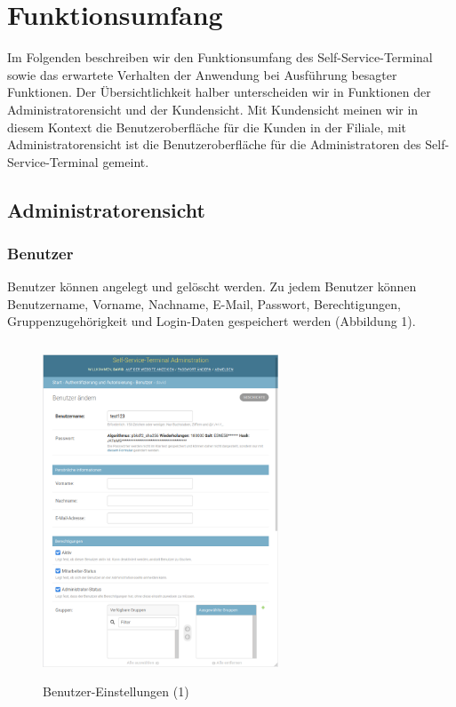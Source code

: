 \section{Funktionsumfang}
Im Folgenden beschreiben wir den Funktionsumfang des Self-Service-Terminal sowie das erwartete Verhalten der Anwendung bei Ausführung besagter Funktionen. Der Übersichtlichkeit halber unterscheiden wir in Funktionen der Administratorensicht und der Kundensicht. Mit Kundensicht meinen wir in diesem Kontext die Benutzeroberfläche für die Kunden in der Filiale, mit Administratorensicht ist die Benutzeroberfläche für die Administratoren des Self-Service-Terminal gemeint.\\

\subsection{Administratorensicht}


\subsubsection{Benutzer} Benutzer können angelegt und gelöscht werden. Zu jedem Benutzer können Benutzername, Vorname, Nachname, E-Mail, Passwort, Berechtigungen, Gruppenzugehörigkeit und Login-Daten gespeichert werden (Abbildung 1).

\begin{figure}[htp]
    \centering
    \includegraphics[width=7cm , height=10cm]{Bilder/AdminBenutzer1.png}
    \caption[Startseite des Self-Service-Terminals]{Benutzer-Einstellungen (1)}
    \label{fig:SSTBenutzer1}
\end{figure}


